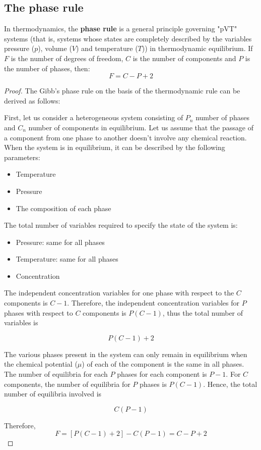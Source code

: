 \subsection{The phase rule}
\begin{theorem}
    In thermodynamics, the \textbf{phase rule} is a general principle governing "pVT" systems (that is, systems whose states are completely described by the variables pressure ($p$), volume ($V$) and temperature ($T$)) in thermodynamic equilibrium. If $F$ is the number of degrees of freedom, $C$ is the number of components and $P$ is the number of phases, then:
    \begin{equation}
        F=C-P+2
    \end{equation}
\end{theorem}
\begin{proof}
    The Gibb’s phase rule on the basis of the thermodynamic rule can be derived as follows:
    
    First, let us consider a heterogeneous system consisting of $P_n$ number of phases and $C_n$ number of components in equilibrium. Let us assume that the passage of a component from one phase to another doesn’t involve any chemical reaction. When the system is in equilibrium, it can be described by the following parameters:
    \begin{itemize}
        \item Temperature
        \item Pressure
        \item The composition of each phase
    \end{itemize}

    The total number of variables required to specify the state of the system is:
    \begin{itemize}
        \item Pressure: same for all phases
        \item Temperature: same for all phases
        \item Concentration
    \end{itemize}

    The independent concentration variables for one phase with respect to the $C$ components is $C-1$. Therefore, the independent concentration variables for $P$ phases with respect to  $C$ components is $P(C-1)$, thus the total number of variables is 
    
    $$P(C-1)+2$$
    
    The various phases present in the system can only remain in equilibrium when the chemical potential ($\mu$) of each of the component is the same in all phases. The number of equilibria for each $P$ phases for each component is $P-1$. For $C$ components, the number of equilibria for $P$ phases is $P(C-1)$. Hence, the total number of equilibria involved is 
    
    $$C (P-1)$$

    Therefore,
    $$F=[P(C-1)+2]-C(P-1)=C-P+2$$
\end{proof}
